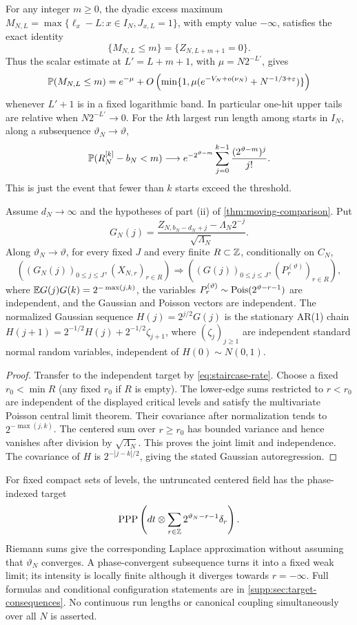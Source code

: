 For any integer $m\ge0$, the dyadic excess maximum
$M_{N,L}=\max\{\ell_x-L:x\in I_N,J_{x,L}=1\}$, with empty value $-\infty$,
satisfies the exact identity
\begin{equation}\label{eq:excess-void}
 \{M_{N,L}\le m\}=\{Z_{N,L+m+1}=0\}.
\end{equation}
Thus the scalar estimate at $L'=L+m+1$, with $\mu=N2^{-L'}$, gives
\[
 \mathbb P(M_{N,L}\le m)=e^{-\mu}
 +O\left(\min\{1,\mu(e^{-V_N+o(\nu_N)}+N^{-1/3+\varepsilon})\}\right)
\]
whenever $L'+1$ is in a fixed logarithmic band. In particular one-hit upper
tails are relative when $N2^{-L'}\to0$.
For the $k$th largest run length among starts in $I_N$, along a subsequence
$\vartheta_N\to\vartheta$,
\begin{equation}\label{eq:order-statistic}
 \mathbb P(R_N^{[k]}-b_N<m)\longrightarrow
 e^{-2^{\vartheta-m}}\sum_{j=0}^{k-1}\frac{(2^{\vartheta-m})^j}{j!}.
\end{equation}
This is just the event that fewer than $k$ starts exceed the threshold.

\begin{theorem}\label{thm:bridge}
Assume $d_N\to\infty$ and the hypotheses of part (ii) of
\cref{thm:moving-comparison}. Put
\[
 G_N(j)=\frac{Z_{N,b_N-d_N+j}-\Lambda_N2^{-j}}{\sqrt{\Lambda_N}}.
\]
Along $\vartheta_N\to\vartheta$, for every fixed $J$ and every finite
$R\subset\mathbb Z$, conditionally on $C_N$,
\[
 ((G_N(j))_{0\le j\le J},(X_{N,r})_{r\in R})
 \Longrightarrow ((G(j))_{0\le j\le J},(P_r^{(\vartheta)})_{r\in R}),
\]
where $\mathbb E G(j)G(k)=2^{-\max(j,k)}$, the variables
$P_r^{(\vartheta)}\sim\operatorname{Pois}(2^{\vartheta-r-1})$ are independent, and the
Gaussian and Poisson vectors are independent. The normalized Gaussian
sequence $H(j)=2^{j/2}G(j)$ is the stationary AR(1) chain
$H(j+1)=2^{-1/2}H(j)+2^{-1/2}\zeta_{j+1}$,
where $(\zeta_j)_{j\ge1}$ are independent standard normal random variables,
independent of $H(0)\sim N(0,1)$.
\end{theorem}
\begin{proof}
Transfer to the independent target by \eqref{eq:staircase-rate}.
Choose a fixed $r_0<\min R$ (any fixed $r_0$ if $R$ is empty).
The lower-edge sums restricted to $r<r_0$ are independent of the displayed
critical levels and satisfy the multivariate Poisson central limit theorem.
Their covariance after normalization tends to $2^{-\max(j,k)}$.
The centered sum over $r\ge r_0$ has bounded variance and hence vanishes
after division by $\sqrt{\Lambda_N}$. This proves the joint limit and
independence. The covariance of $H$ is $2^{-|j-k|/2}$, giving the stated
Gaussian autoregression.
\end{proof}
For fixed compact sets of levels, the untruncated centered field has the
phase-indexed target
\[
 {\rm PPP}\left(dt\otimes\sum_{r\in\mathbb Z}2^{\vartheta_N-r-1}\delta_r\right).
\]
Riemann sums give the corresponding Laplace approximation without assuming
that $\vartheta_N$ converges. A phase-convergent subsequence turns it into
a fixed weak limit; its intensity is locally finite although it diverges
towards $r=-\infty$. Full formulas and conditional configuration statements
are in \cref{supp:sec:target-consequences}. No continuous run lengths or
canonical coupling simultaneously over all $N$ is asserted.
